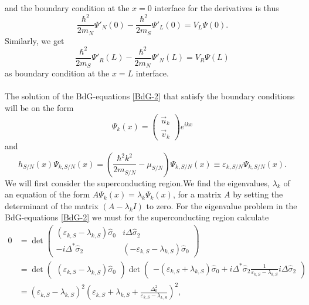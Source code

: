 and the boundary condition at the $x=0$ interface for the derivatives is thus
\begin{equation}
    \frac{\hbar^2}{2m_N} \Psi'_N(0) - \frac{\hbar^2}{2m_S} \Psi'_L(0) = V_L\Psi(0).
\end{equation}
Similarly, we get
\begin{equation}
    \frac{\hbar^2}{2m_S} \Psi'_R(L) - \frac{\hbar^2}{2m_N} \Psi'_N(L) = V_R\Psi(L)
\end{equation}
as boundary condition at the $x=L$ interface.
\\
\\
The solution of the BdG-equations \eqref{BdG-2} that satisfy the boundary conditions will be on the form 
\begin{equation}
    \Psi_{k}(x) = 
    \begin{pmatrix}
    \vec{u}_k \\ \vec{v}_k
    \end{pmatrix}
    e^{ikx}
\end{equation}
and 
\begin{equation}
    h_{S/N}(x)\Psi_{k,S/N}(x) = \left(\frac{\hbar^2k^2}{2m_{S/N}}-\mu_{S/N}\right)\Psi_{k,S/N}(x) \equiv \varepsilon_{k,S/N} \Psi_{k,S/N}(x).
\end{equation}
We will first consider the superconducting region.We find the eigenvalues, $\lambda_k$ of an equation of the form $A\Psi_k(x) = \lambda_k\Psi_k(x)$, for a matrix $A$ by setting the determinant of the matrix $(A-\lambda_kI)$ to zero. For the eigenvalue problem in the BdG-equations \eqref{BdG-2} we must for the superconducting region calculate
\begin{equation}
\begin{split}
    0 &= 
    \det\begin{pmatrix}
        \left(\varepsilon_{k,S} - \lambda_{k,S}\right)\hat{\sigma}_0 & i\Delta\hat{\sigma}_2 \\
        -i\Delta^*\hat{\sigma}_2 & \left(-\varepsilon_{k,S} - \lambda_{k,S}\right)\hat{\sigma}_0
    \end{pmatrix}
    \\ &= 
    \det\begin{pmatrix}(\varepsilon_{k,S} -\lambda_{k,S})\hat{\sigma}_0\end{pmatrix}
    \det\begin{pmatrix}
    -(\varepsilon_{k,S} + \lambda_{k,S})\hat{\sigma}_0 + i\Delta^*\hat{\sigma}_2\frac{1}{\varepsilon_{k,S}-\lambda_{k,S}}i\Delta\hat{\sigma}_2
    \end{pmatrix}
    \\&=
    \left(\varepsilon_{k,S}-\lambda_{k,S}\right)^2\left(\varepsilon_{k,S} + \lambda_{k,S} + \frac{\Delta_0^2}{\varepsilon_{k,S} - \lambda_{k,S}}\right)^2,
\end{split}
\label{det}
\end{equation}
